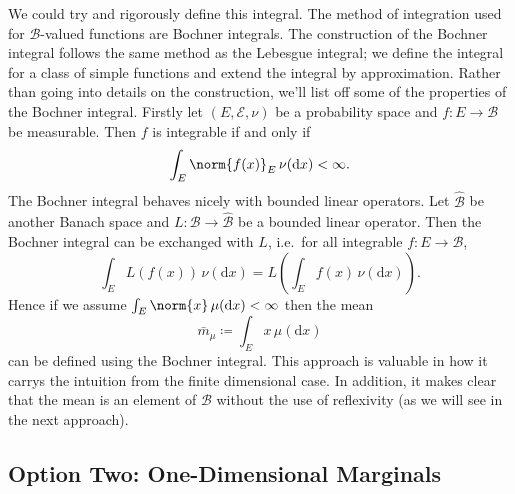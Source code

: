 \documentclass[fontsize=12pt, DIV=10]{scrreprt}
\theoremstyle{remark}
\newcommand{\defeq}{\coloneqq}
\newcommand{\calB}{\mathcal B}
\newcommand{\calE}{\mathcal E}
\newcommand{\dif}[1]{\text{d} #1}
\begin{document}
We could try and rigorously define this integral. The method of integration used for $\calB$-valued functions are Bochner integrals. The construction of the Bochner integral follows the same method as the Lebesgue integral; we define the integral for a class of simple functions and extend the integral by approximation. Rather than going into details on the construction, we'll list off some of the properties of the Bochner integral. Firstly let $(E, \calE, \nu)$ be a probability space and $f: E \to \calB$ be measurable. Then $f$ is integrable if and only if
\begin{equation}
	\int_E \norm{f(x)}_E \, \nu(\dif x) < \infty.
\end{equation}
The Bochner integral behaves nicely with bounded linear operators. Let $\hat{\calB}$ be another Banach space and $L: \calB \to \hat{\calB}$ be a bounded linear operator. Then the Bochner integral can be exchanged with $L$, i.e.\ for all integrable $f: E \to \calB$,
\begin{equation}
	\int_E L(f(x)) \, \nu(\dif x) = L\left( \int_E f(x) \, \nu(\dif x)\right).
\end{equation}
Hence if we assume $\int_E \norm{x} \, \mu(\dif x) < \infty$ then the mean
\begin{equation}
	\bar{m}_{\mu} \defeq \int_E x \, \mu(\dif x)
\end{equation}
can be defined using the Bochner integral. This approach is valuable in how it carrys the intuition from the finite dimensional case. In addition, it makes clear that the mean is an element of $\calB$ without the use of reflexivity (as we will see in the next approach). 

\subsection{Option Two: One-Dimensional Marginals}
\end{document}
